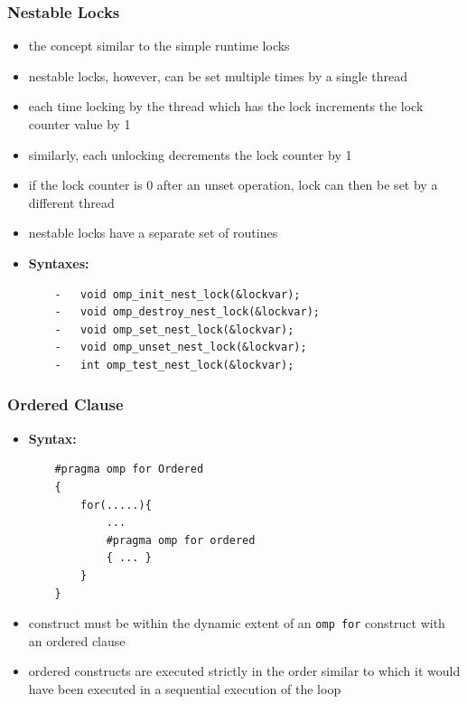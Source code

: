\documentclass[12pt, a4paper]{report}
\begin{document}
\subsubsection{Nestable Locks}
\begin{itemize}
    \item the concept similar to the simple runtime locks
    \item nestable locks, however, can be set multiple times by a single thread
    \item each time locking by the thread which has the lock increments the lock counter value by 1
    \item similarly, each unlocking decrements the lock counter by 1
    \item if the lock counter is 0 after an unset operation, lock can then be set by a different thread
    \item nestable locks have a separate set of routines
    \item {\bfseries{Syntaxes:}}
    \begin{verbatim}
    -   void omp_init_nest_lock(&lockvar);
    -   void omp_destroy_nest_lock(&lockvar);
    -   void omp_set_nest_lock(&lockvar);
    -   void omp_unset_nest_lock(&lockvar);
    -   int omp_test_nest_lock(&lockvar);
    \end{verbatim}
\end{itemize}

\subsubsection{Ordered Clause}
\begin{itemize}
    \item {\bfseries{Syntax:}}
    \begin{verbatim}
    #pragma omp for Ordered
    {
        for(.....){
            ...
            #pragma omp for ordered
            { ... }
        }
    }
    \end{verbatim}
    \item construct must be within the dynamic extent of an \verb$omp for$ construct with an ordered clause
    \item ordered constructs are executed strictly in the order similar to which it would have been executed in a sequential execution of the loop
\end{itemize}
\end{document}
